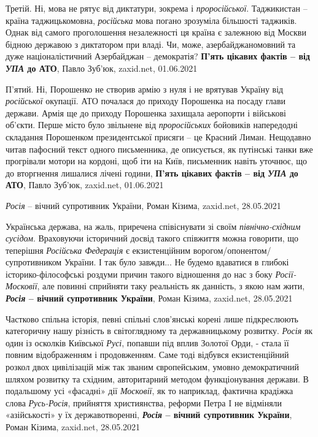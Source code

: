 Третій. Ні, мова не рятує від диктатури, зокрема і \emph{проросійської}. Таджикистан –
країна таджицькомовна, \emph{російська} мова погано зрозуміла більшості таджиків.
Однак від самого проголошення незалежності ця країна є залежною від Москви
бідною державою з диктатором при владі. Чи, може, азербайджаномовний та дуже
націоналістичний Азербайджан – демократія?
\textbf{П'ять цікавих фактів – від \emph{УПА} до АТО}, Павло Зуб'юк, zaxid.net, 01.06.2021

П'ятий. Ні, Порошенко не створив армію з нуля і не врятував Україну від
\emph{російської} окупації. АТО почалася до приходу Порошенка на посаду глави держави.
Армія ще до приходу Порошенка захищала аеропорти і військові об'єкти. Перше
місто було звільнене від \emph{проросійських} бойовиків напередодні складання
Порошенком президентської присяги – це Красний Лиман. Нещодавно читав пафосний
текст одного письменника, де описується, як путінські танки вже прогрівали
мотори на кордоні, щоб іти на Київ, письменник навіть уточнює, що до вторгнення
лишалися лічені години,
\textbf{П'ять цікавих фактів – від \emph{УПА} до АТО}, Павло Зуб'юк, zaxid.net, 01.06.2021

\emph{Росія} – вічний супротивник України, Роман Кізима, zaxid.net, 28.05.2021

Українська держава, на жаль, приречена співіснувати зі своїм \emph{північно-східним
сусідом}. Враховуючи історичний досвід такого співжиття можна говорити, що
теперішня \emph{Російська Федерація} є екзистенційним ворогом/опонентом/супротивником
України. І так було завжди... Не будемо вдаватися в глибокі історико-філософські
роздуми причин такого відношення до нас з боку \emph{Росії-Московії}, але повинні
сприйняти таку реальність як данність, з якою нам жити,
\textbf{\emph{Росія} – вічний супротивник України}, Роман Кізима, zaxid.net, 28.05.2021

Частково спільна історія, певні спільні слов'янські корені лише підкреслюють
категоричну нашу різність в світоглядному та державницькому розвитку.
\emph{Росія} як один із осколків Київської \emph{Русі}, попавши під вплив
Золотої Орди, - стала її повним відображенням і продовженням. Саме тоді
відбувся екзистенційний розкол двох цивілізацій між так званим європейським,
умовно демократичний шляхом розвитку та східним, авторитарний методом
функціонування держави. В подальшому усі «фасадні» дії \emph{Московії}, як то
наприклад, фактична крадіжка слова \emph{Русь-Росія}, прийняття християнства,
реформи Петра I не відміняли «азійськості» у їх державотворенні,
\textbf{\emph{Росія} – вічний супротивник України}, Роман Кізима, zaxid.net, 28.05.2021

